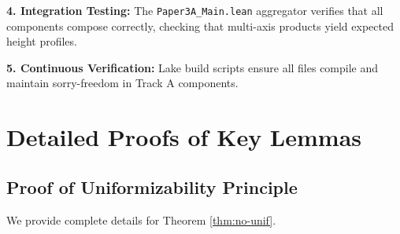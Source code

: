 \documentclass[11pt]{article}
\theoremstyle{plain}
\theoremstyle{definition}
\begin{document}
\textbf{4. Integration Testing:} The \texttt{Paper3A\_Main.lean} aggregator verifies that all components compose correctly, checking that multi-axis products yield expected height profiles.

\textbf{5. Continuous Verification:} Lake build scripts ensure all files compile and maintain sorry-freedom in Track A components.

\section{Detailed Proofs of Key Lemmas}

\subsection{Proof of Uniformizability Principle}

We provide complete details for Theorem \ref{thm:no-unif}.
\end{document}
